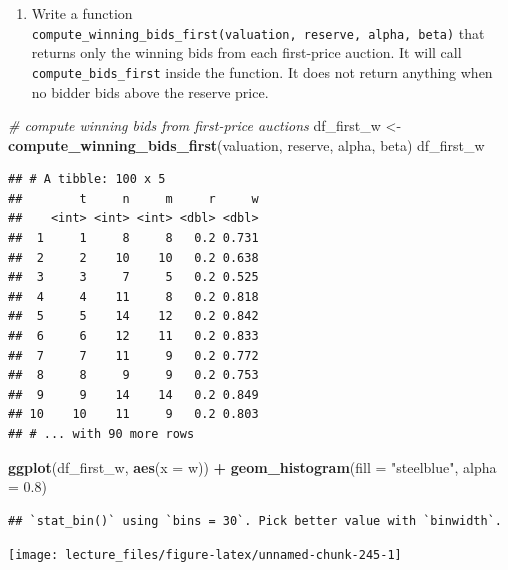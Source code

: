 \documentclass[]{book}
\newenvironment{Shaded}{\begin{snugshade}}{\end{snugshade}}
\newcommand{\KeywordTok}[1]{\textcolor[rgb]{0.13,0.29,0.53}{\textbf{#1}}}
\newcommand{\DataTypeTok}[1]{\textcolor[rgb]{0.13,0.29,0.53}{#1}}
\newcommand{\FloatTok}[1]{\textcolor[rgb]{0.00,0.00,0.81}{#1}}
\newcommand{\StringTok}[1]{\textcolor[rgb]{0.31,0.60,0.02}{#1}}
\newcommand{\CommentTok}[1]{\textcolor[rgb]{0.56,0.35,0.01}{\textit{#1}}}
\newcommand{\OperatorTok}[1]{\textcolor[rgb]{0.81,0.36,0.00}{\textbf{#1}}}
\newcommand{\NormalTok}[1]{#1}
\providecommand{\tightlist}{%
  \setlength{\itemsep}{0pt}\setlength{\parskip}{0pt}}
\begin{document}
\begin{enumerate}
\def\labelenumi{\arabic{enumi}.}
\setcounter{enumi}{5}
\tightlist
\item
  Write a function
  \texttt{compute\_winning\_bids\_first(valuation,\ reserve,\ alpha,\ beta)}
  that returns only the winning bids from each first-price auction. It
  will call \texttt{compute\_bids\_first} inside the function. It does
  not return anything when no bidder bids above the reserve price.
\end{enumerate}

\begin{Shaded}
\begin{Highlighting}[]
\CommentTok{# compute winning bids from first-price auctions}
\NormalTok{df_first_w <-}
\StringTok{  }\KeywordTok{compute_winning_bids_first}\NormalTok{(valuation, reserve, alpha, beta)}
\NormalTok{df_first_w}
\end{Highlighting}
\end{Shaded}

\begin{verbatim}
## # A tibble: 100 x 5
##        t     n     m     r     w
##    <int> <int> <int> <dbl> <dbl>
##  1     1     8     8   0.2 0.731
##  2     2    10    10   0.2 0.638
##  3     3     7     5   0.2 0.525
##  4     4    11     8   0.2 0.818
##  5     5    14    12   0.2 0.842
##  6     6    12    11   0.2 0.833
##  7     7    11     9   0.2 0.772
##  8     8     9     9   0.2 0.753
##  9     9    14    14   0.2 0.849
## 10    10    11     9   0.2 0.803
## # ... with 90 more rows
\end{verbatim}

\begin{Shaded}
\begin{Highlighting}[]
\KeywordTok{ggplot}\NormalTok{(df_first_w, }\KeywordTok{aes}\NormalTok{(}\DataTypeTok{x =}\NormalTok{ w)) }\OperatorTok{+}\StringTok{ }\KeywordTok{geom_histogram}\NormalTok{(}\DataTypeTok{fill =} \StringTok{"steelblue"}\NormalTok{, }\DataTypeTok{alpha =} \FloatTok{0.8}\NormalTok{)}
\end{Highlighting}
\end{Shaded}

\begin{verbatim}
## `stat_bin()` using `bins = 30`. Pick better value with `binwidth`.
\end{verbatim}

\begin{center}\texttt{[image: lecture\_files/figure-latex/unnamed-chunk-245-1]} \end{center}
\end{document}
